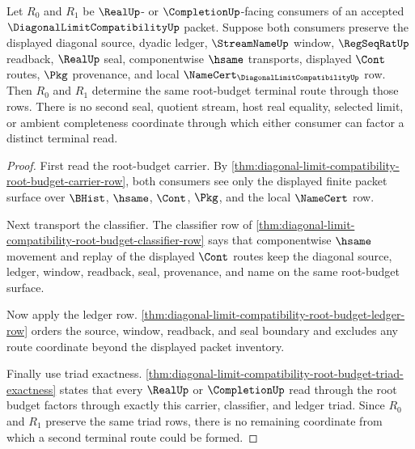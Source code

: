 \begin{theorem}
\label{thm:diagonal-limit-compatibility-root-budget-terminal-route-uniqueness}
Let $R_0$ and $R_1$ be $\RealUp$- or $\CompletionUp$-facing consumers of an accepted $\DiagonalLimitCompatibilityUp$ packet. Suppose both consumers preserve the displayed diagonal source, dyadic ledger, $\StreamNameUp$ window, $\RegSeqRatUp$ readback, $\RealUp$ seal, componentwise $\hsame$ transports, displayed $\Cont$ routes, $\Pkg$ provenance, and local $\NameCert_{\DiagonalLimitCompatibilityUp}$ row. Then $R_0$ and $R_1$ determine the same root-budget terminal route through those rows. There is no second seal, quotient stream, host real equality, selected limit, or ambient completeness coordinate through which either consumer can factor a distinct terminal read.
\end{theorem}
\begin{proof}
First read the root-budget carrier. By \autoref{thm:diagonal-limit-compatibility-root-budget-carrier-row}, both consumers see only the displayed finite packet surface over $\BHist$, $\hsame$, $\Cont$, $\Pkg$, and the local $\NameCert$ row.

Next transport the classifier. The classifier row of \autoref{thm:diagonal-limit-compatibility-root-budget-classifier-row} says that componentwise $\hsame$ movement and replay of the displayed $\Cont$ routes keep the diagonal source, ledger, window, readback, seal, provenance, and name on the same root-budget surface.

Now apply the ledger row. \autoref{thm:diagonal-limit-compatibility-root-budget-ledger-row} orders the source, window, readback, and seal boundary and excludes any route coordinate beyond the displayed packet inventory.

Finally use triad exactness. \autoref{thm:diagonal-limit-compatibility-root-budget-triad-exactness} states that every $\RealUp$ or $\CompletionUp$ read through the root budget factors through exactly this carrier, classifier, and ledger triad. Since $R_0$ and $R_1$ preserve the same triad rows, there is no remaining coordinate from which a second terminal route could be formed.
\end{proof}

